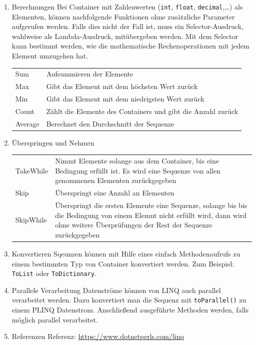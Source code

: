 \documentclass[11pt]{article}
\begin{document}
\begin{enumerate}
\begin{center}
\begin{tabular}{ll}
\end{tabular}
\end{center}
\item Berechnungen
\label{sec:orgheadline38}
Bei Container mit Zahlenwerten (\texttt{int}, \texttt{float}, \texttt{decimal},\ldots{}) als Elementen,
können nachfolgende Funktionen ohne zusätzliche Parameter aufgerufen werden.
Falls dies nicht der Fall ist, muss ein Selector-Ausdruck, wahlweise als
Lambda-Ausdruck, mitübergeben werden. Mit dem Selector kann bestimmt werden, wie
die mathematische Rechenoperationen mit jedem Element umzugehen hat.
\begin{center}
\begin{tabular}{ll}
Sum & Aufsummieren der Elemente\\
Max & Gibt das Element mit dem höchsten Wert zurück\\
Min & Gibt das Element mit dem niedrigsten Wert zurück\\
Count & Zählt die Elemente des Containers und gibt die Anzahl zurück\\
Average & Berechnet den Durchschnitt der Sequenze\\
\end{tabular}
\end{center}
\item Überspringen und Nehmen
\label{sec:orgheadline39}
\begin{center}
\begin{tabular}{ll}
TakeWhile & Nimmt Elemente solange aus dem Container, bis eine Bedingung erfüllt ist. Es wird eine Sequenze von allen genommenen Elementen zurückgegeben\\
Skip & Überspringt eine Anzahl an Elementen\\
SkipWhile & Überspringt die ersten Elemente eine Sequenze, solange bis bis die Bedingung von einem Elemnt nicht erfüllt wird, dann wird ohne weitere Überprüfungen der Rest der Sequenze zurückgegeben\\
\end{tabular}
\end{center}
\item Konvertieren
\label{sec:orgheadline40}
Sqeunzen können mit Hilfe eines einfach Methodenaufrufs zu einem bestimmten Typ
von Container konvertiert werden. Zum Beispiel: \texttt{ToList} oder \texttt{ToDictionary}.

\item Parallele Verarbeitung
\label{sec:orgheadline41}
Datenströme können von LINQ auch parallel verarbeitet werden. Dazu konvertiert
man die Sequenz mit \texttt{toParallel()} zu einem PLINQ Datenstrom.
Anschließend ausgeführte Methoden werden, falls möglich parallel verarbeitet. 

\item Referenzen
\label{sec:orgheadline42}
Referenz: \url{https://www.dotnetperls.com/linq}
\end{enumerate}
\end{document}
